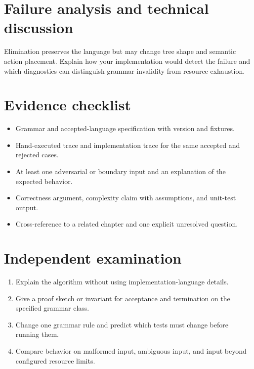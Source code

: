 \documentclass[11pt,letterpaper]{article}
\begin{document}
\section{Failure analysis and technical discussion}
Elimination preserves the language but may change tree shape and semantic action placement. Explain how your implementation would detect the failure and which diagnostics can distinguish grammar invalidity from resource exhaustion.
\section{Evidence checklist}
\begin{itemize}
\item Grammar and accepted-language specification with version and fixtures.
\item Hand-executed trace and implementation trace for the same accepted and rejected cases.
\item At least one adversarial or boundary input and an explanation of the expected behavior.
\item Correctness argument, complexity claim with assumptions, and unit-test output.
\item Cross-reference to a related chapter and one explicit unresolved question.
\end{itemize}
\section{Independent examination}
\begin{enumerate}
\item Explain the algorithm without using implementation-language details.
\item Give a proof sketch or invariant for acceptance and termination on the specified grammar class.
\item Change one grammar rule and predict which tests must change before running them.
\item Compare behavior on malformed input, ambiguous input, and input beyond configured resource limits.
\end{enumerate}
\end{document}
